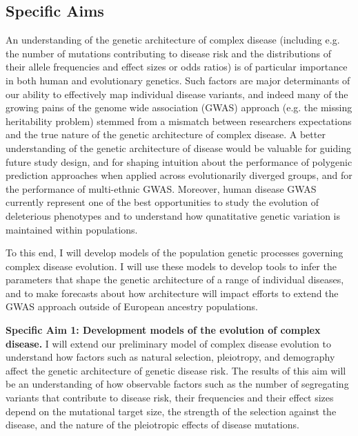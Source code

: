 \documentclass[11pt]{article}
\begin{document}
\setlength{\parskip}{\baselineskip}

\subsection*{Specific Aims}


An understanding of the genetic architecture of complex disease (including e.g. the number of mutations contributing to disease risk and the distributions of their allele frequencies and effect sizes or odds ratios) is of particular importance in both human and evolutionary genetics. Such factors are major determinants of our ability to effectively map individual disease variants, and indeed many of the growing pains of the genome wide association (GWAS) approach (e.g. the missing heritability problem) stemmed from a mismatch between researchers expectations and the true nature of the genetic architecture of complex disease. A better understanding of the genetic architecture of disease would be valuable for guiding future study design, and for shaping intuition about the performance of polygenic prediction approaches when applied across evolutionarily diverged groups, and for the performance of multi-ethnic GWAS. Moreover, human disease GWAS currently represent one of the best opportunities to study the evolution of deleterious phenotypes and to understand how qunatitative genetic variation is maintained within populations.

To this end, I will develop models of the population genetic processes governing complex disease evolution. I will use these models to develop tools to infer the parameters that shape the genetic architecture of a range of individual diseases, and to make forecasts about how architecture will impact efforts to extend the GWAS approach outside of European ancestry populations.

\textbf{Specific Aim 1: Development models of the evolution of complex disease.} I will extend our preliminary model of complex disease evolution to understand how factors such as natural selection, pleiotropy, and demography affect the genetic architecture of genetic disease risk. The results of this aim will be an understanding of how observable factors such as the number of segregating variants that contribute to disease risk, their frequencies and their effect sizes depend on the mutational target size, the strength of the selection against the disease, and the nature of the pleiotropic effects of disease mutations.
\end{document}
